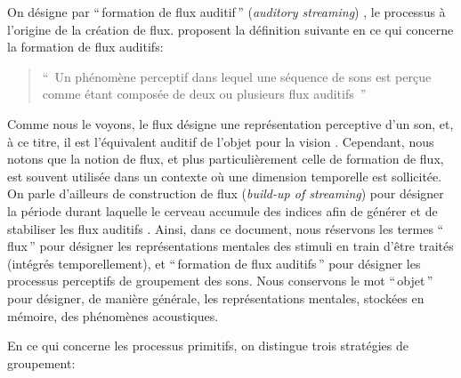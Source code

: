 On désigne par ``\,formation de flux auditif\,'' (\emph{auditory streaming}) , le processus à l'origine de la création de flux. \citep{winkler2009modeling} proposent la définition suivante en ce qui concerne la formation de flux auditifs:

\begin{quote}
``\, Un phénomène perceptif dans lequel une séquence de sons est perçue comme étant composée de deux ou plusieurs flux auditifs \,''
\end{quote}

Comme nous le voyons, le flux désigne une représentation perceptive d'un son, et, à ce titre, il est l'équivalent auditif de l'objet pour la vision \citep[p. 11]{bregman1994auditory}. Cependant, nous notons que la notion de flux, et plus particulièrement celle de formation de flux, est souvent utilisée dans un contexte où une dimension temporelle est sollicitée. On parle d'ailleurs de construction de flux (\emph{build-up of streaming}) pour désigner la période durant laquelle le cerveau accumule des indices afin de générer et de stabiliser les flux auditifs  \citep{cusack2004effects,snyder2007toward}. Ainsi, dans ce document, nous réservons les termes ``\,flux\,'' pour désigner les représentations mentales des stimuli en train d'être traités (intégrés temporellement), et ``\,formation de flux auditifs\,'' pour désigner les processus perceptifs de groupement des sons. Nous conservons le mot ``\,objet\,'' pour désigner, de manière générale, les représentations mentales, stockées en mémoire, des phénomènes acoustiques.

En ce qui concerne les processus primitifs, on distingue trois stratégies de groupement:

